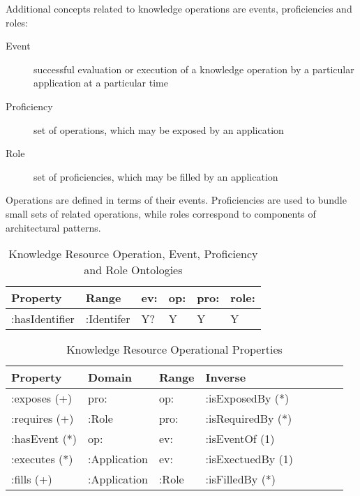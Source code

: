 \documentclass[runningheads]{llncs}
\begin{document}
Additional concepts related to knowledge operations are events, proficiencies and roles:
\begin{description}
  \item[Event] successful evaluation or execution of a knowledge operation by a particular application at a particular time
  \item[Proficiency] set of operations, which may be exposed by an application
  \item[Role] set of proficiencies, which may be filled by an application
\end{description}

Operations are defined in terms of their events. Proficiencies are used to bundle small sets of related operations, while roles correspond to components of architectural patterns.


\begin{table}[h]
\centering
\begin{tabular}{|l|l|l|l|l|l|}
 \hline
\textbf{Property} & \textbf{Range} & \textbf{ev:} & \textbf{op:}  & \textbf{pro:} & \textbf{role:} \\ \hline
:hasIdentifier    & :Identifer     & Y?           & Y             & Y             & Y              \\ \hline
\end{tabular}
\caption{Knowledge Resource Operation, Event, Proficiency and Role Ontologies}
\label{kroponto}
\end{table}

\begin{table}[h]
\begin{tabular}{|l|l|l|l|l|l|l|l|}
\hline
\textbf{Property}  &\textbf{Domain}  & \textbf{Range}  & \textbf{Inverse}
\\ \hline
:exposes (+)       & pro:            & op:             & :isExposedBy (*)         \\ \hline
:requires (+)      & :Role           & pro:            & :isRequiredBy (*)         \\ \hline
:hasEvent (*)      & op:             & ev:             & :isEventOf  (1)         \\ \hline
:executes (*)      & :Application    & ev:             & :isExectuedBy  (1)         \\ \hline
:fills (+)         & :Application    & :Role           & :isFilledBy  (*)         \\ \hline
\end{tabular}
\caption{Knowledge Resource Operational Properties}
\label{kropprop}
\end{table}
\end{document}
